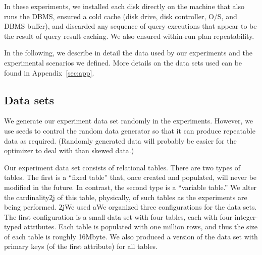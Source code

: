 \documentclass[prodmode,acmtods]{acmsmall}
\begin{document}

In these experiments, we  installed each disk directly
on the machine that also runs the DBMS, ensured a cold cache (disk drive,
disk controller, O/S, and DBMS buffer), and discarded any sequence of query
executions that appear to be the result of query result caching. We also
ensured within-run plan repeatability.

In the following, we describe in detail the data used by our experiments and
the experimental scenarios we defined. More details on the data sets used
can be found in Appendix~\ref{sec:app}.

\subsection{Data sets}\label{sec:datasets}
We generate our experiment data set randomly in the experiments. However, we
use seeds to control the random data generator so that it can produce
repeatable data as required. (Randomly generated data will probably be
easier for the optimizer to deal with than skewed data.)

Our experiment data set consists of relational tables. There are two types of
tables. The first is a ``fixed table'' that, once created and
populated, will never be modified in the future.  In contrast, the second
type is a ``variable table.'' We alter the cardinality\c2j{ of
  this table}{, physically, of such tables} as the experiments are being performed. 
\c2j{We used a}{We organized three configurations for the data sets. The first configuration
is a small} data set with four tables, each with four integer-typed
attributes. Each table is populated with one million rows, and thus the size
of each table is roughly 16Mbyte. We also produced a version of the data set with primary
keys (of the first attribute) for all tables.  
\end{document}
